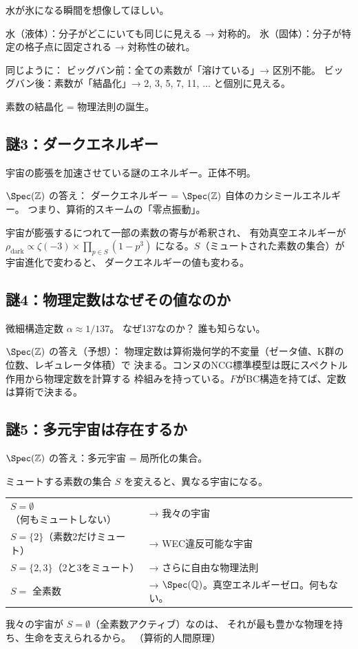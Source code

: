 \documentclass[12pt,a4paper]{article}
\begin{document}
\begin{analogybox}
水が氷になる瞬間を想像してほしい。

水（液体）：分子がどこにいても同じに見える → 対称的。
氷（固体）：分子が特定の格子点に固定される → 対称性の破れ。

同じように：
ビッグバン前：全ての素数が「溶けている」→ 区別不能。
ビッグバン後：素数が「結晶化」→ 2, 3, 5, 7, 11, ... と個別に見える。

素数の結晶化 = 物理法則の誕生。
\end{analogybox}

\subsection{謎3：ダークエネルギー}

宇宙の膨張を加速させている謎のエネルギー。正体不明。

$\Spec(\mathbb{Z})$ の答え：
ダークエネルギー = $\Spec(\mathbb{Z})$ 自体のカシミールエネルギー。
つまり、算術的スキームの「零点振動」。

宇宙が膨張するにつれて一部の素数の寄与が希釈され、
有効真空エネルギーが
$\rho_{\mathrm{dark}} \propto \zeta(-3) \times \prod_{p \in S}(1-p^3)$
になる。$S$（ミュートされた素数の集合）が宇宙進化で変わると、
ダークエネルギーの値も変わる。

\subsection{謎4：物理定数はなぜその値なのか}

微細構造定数 $\alpha \approx 1/137$。
なぜ137なのか？ 誰も知らない。

$\Spec(\mathbb{Z})$ の答え（予想）：
物理定数は算術幾何学的不変量（ゼータ値、K群の位数、レギュレータ体積）で
決まる。コンヌのNCG標準模型は既にスペクトル作用から物理定数を計算する
枠組みを持っている。$F$がBC構造を持てば、定数は算術で決まる。

\subsection{謎5：多元宇宙は存在するか}

$\Spec(\mathbb{Z})$ の答え：多元宇宙 = 局所化の集合。

\begin{keybox}[算術的多元宇宙]
ミュートする素数の集合 $S$ を変えると、異なる宇宙になる。

\begin{tabular}{ll}
$S = \emptyset$（何もミュートしない） & → 我々の宇宙 \\
$S = \{2\}$（素数2だけミュート） & → WEC違反可能な宇宙 \\
$S = \{2, 3\}$（2と3をミュート） & → さらに自由な物理法則 \\
$S = $ 全素数 & → $\Spec(\mathbb{Q})$。真空エネルギーゼロ。何もない。\\
\end{tabular}

我々の宇宙が $S = \emptyset$（全素数アクティブ）なのは、
それが最も豊かな物理を持ち、生命を支えられるから。
（算術的人間原理）
\end{keybox}
\end{document}
